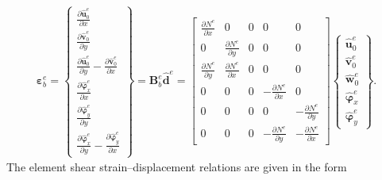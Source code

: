\begin{eqnarray}
	\boldsymbol{\varepsilon}_b^e = 
	\left \{ \begin{array}{c}
		\frac{\partial \widehat{\textbf{u}}_0^e}{\partial x} \\
		\frac{\partial \widehat{\textbf{v}}_0^e}{\partial y} \\
		\frac{\partial \widehat{\textbf{u}}_0^e}{\partial y} - \frac{\partial \widehat{\textbf{v}}_0^e}{\partial x}\\
		\frac{\partial \widehat{\boldsymbol{\varphi}}_x^e}{\partial x} \\
		\frac{\partial \widehat{\boldsymbol{\varphi}}_y^e}{\partial y} \\
		\frac{\partial \widehat{\boldsymbol{\varphi}}_x^e}{\partial y} - \frac{\partial \widehat{\boldsymbol{\varphi}}_y^e}{\partial x}
	\end{array} \right\} = 
	\textbf{B}_b^e\widehat{\textbf{d}}^e = 
	\left [
	\begin{array}{ccccc}
		\frac{\partial N^e}{\partial x} & 0 & 0 & 0 & 0\\
		0 & \frac{\partial N^e}{\partial y} & 0 & 0 & 0\\
		\frac{\partial N^e}{\partial y} & \frac{\partial N^e}{\partial x} & 0 & 0 & 0\\
		0 & 0 & 0 & -\frac{\partial N^e}{\partial x} & 0\\
		0 & 0 & 0 & 0 & -\frac{\partial N^e}{\partial y}\\
		0 & 0 & 0 & -\frac{\partial N^e}{\partial y} & -\frac{\partial N^e}{\partial x}
	\end{array} \right]
	\left \{ \begin{array}{c}
		\widehat{\textbf{u}}_0^e \\
		\widehat{\textbf{v}}_0^e \\
		\widehat{\textbf{w}}_0^e \\
		\widehat{\boldsymbol{\varphi}}_x^e \\
		\widehat{\boldsymbol{\varphi}}_y^e
	\end{array} \right\}.
\end{eqnarray}
The element shear strain--displacement relations are given in the form
